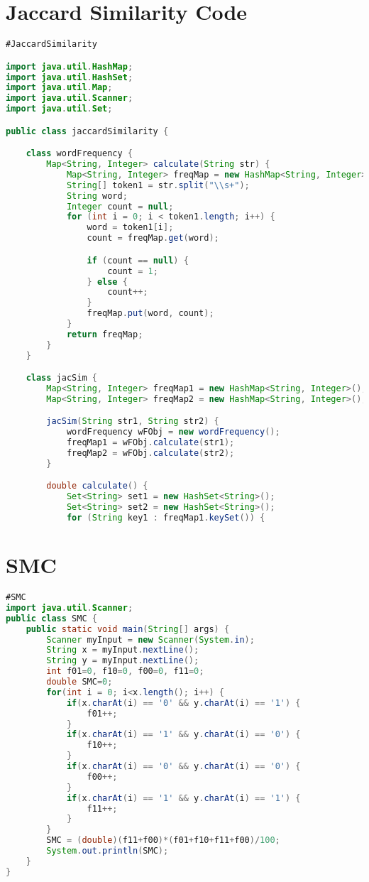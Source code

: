 \documentclass{article}
\begin{document}
\section*{Jaccard Similarity Code}
\begin{lstlisting}[language=Java, caption=Jaccard Similarity Implementation]
#JaccardSimilarity

import java.util.HashMap;
import java.util.HashSet;
import java.util.Map;
import java.util.Scanner;
import java.util.Set;

public class jaccardSimilarity {

    class wordFrequency {
        Map<String, Integer> calculate(String str) {
            Map<String, Integer> freqMap = new HashMap<String, Integer>();
            String[] token1 = str.split("\\s+");
            String word;
            Integer count = null;
            for (int i = 0; i < token1.length; i++) {
                word = token1[i];
                count = freqMap.get(word);

                if (count == null) {
                    count = 1;
                } else {
                    count++;
                }
                freqMap.put(word, count);
            }
            return freqMap;
        }
    }

    class jacSim {
        Map<String, Integer> freqMap1 = new HashMap<String, Integer>();
        Map<String, Integer> freqMap2 = new HashMap<String, Integer>();

        jacSim(String str1, String str2) {
            wordFrequency wFObj = new wordFrequency();
            freqMap1 = wFObj.calculate(str1);
            freqMap2 = wFObj.calculate(str2);
        }

        double calculate() {
            Set<String> set1 = new HashSet<String>();
            Set<String> set2 = new HashSet<String>();
            for (String key1 : freqMap1.keySet()) {
\end{lstlisting}

\section*{SMC}
\begin{lstlisting}[language=Java, caption=Cosine Similarity Implementation]
#SMC
import java.util.Scanner;
public class SMC {
	public static void main(String[] args) {
		Scanner myInput = new Scanner(System.in);
		String x = myInput.nextLine();
		String y = myInput.nextLine();
		int f01=0, f10=0, f00=0, f11=0;
		double SMC=0;
		for(int i = 0; i<x.length(); i++) {
			if(x.charAt(i) == '0' && y.charAt(i) == '1') {
				f01++;
			}
			if(x.charAt(i) == '1' && y.charAt(i) == '0') {
				f10++;
			}
			if(x.charAt(i) == '0' && y.charAt(i) == '0') {
				f00++;
			}
			if(x.charAt(i) == '1' && y.charAt(i) == '1') {
				f11++;
			}
		}
		SMC = (double)(f11+f00)*(f01+f10+f11+f00)/100;
		System.out.println(SMC);
	}
}


\end{lstlisting}
\end{document}
